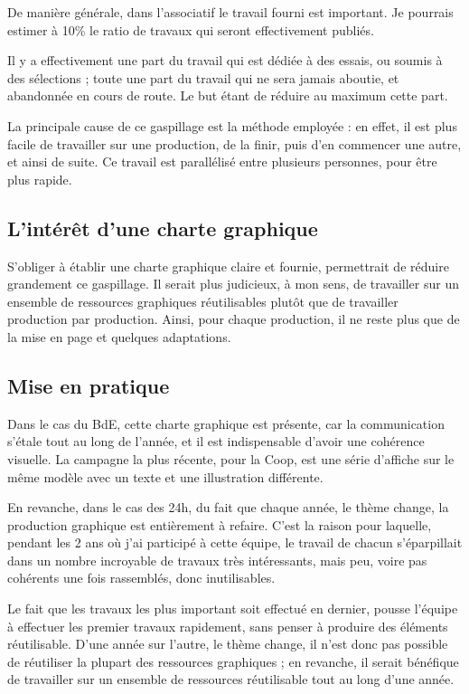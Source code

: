     De manière générale, dans l'associatif le travail fourni est important. Je pourrais estimer à 10\% le ratio de travaux qui seront effectivement publiés.

    Il y a effectivement une part du travail qui est dédiée à des essais, ou soumis à des sélections ; toute une part du travail qui ne sera jamais aboutie, et abandonnée en cours de route. Le but étant de réduire au maximum cette part.

    La principale cause de ce gaspillage est la méthode employée : en effet, il est plus facile de travailler sur une production, de la finir, puis d'en commencer une autre, et ainsi de suite. Ce travail est parallélisé entre plusieurs personnes, pour être plus rapide.

    \subsection{L'intérêt d'une charte graphique}
    
        S'obliger à établir une charte graphique claire et fournie, permettrait de réduire grandement ce gaspillage.
        Il serait plus judicieux, à mon sens, de travailler sur un ensemble de ressources graphiques réutilisables plutôt que de travailler production par production.
        Ainsi, pour chaque production, il ne reste plus que de la mise en page et quelques adaptations.

    \subsection{Mise en pratique}

        Dans le cas du BdE, cette charte graphique est présente, car la communication s'étale tout au long de l'année, et il est indispensable d'avoir une cohérence visuelle.
        La campagne la plus récente, pour la Coop, est une série d'affiche sur le même modèle avec un texte et une illustration différente.
        
        En revanche, dans le cas des 24h, du fait que chaque année, le thème change, la production graphique est entièrement à refaire.
        C'est la raison pour laquelle, pendant les 2 ans où j'ai participé à cette équipe, le travail de chacun s'éparpillait dans un nombre incroyable de travaux très intéressants, mais peu, voire pas cohérents une fois rassemblés, donc inutilisables.
        
        Le fait que les travaux les plus important soit effectué en dernier, pousse l'équipe à effectuer les premier travaux rapidement, sans penser à produire des éléments réutilisable.
        D'une année sur l'autre, le thème change, il n'est donc pas possible de réutiliser la plupart des ressources graphiques ; en revanche, il serait bénéfique de travailler sur un ensemble de ressources réutilisable tout au long d'une année.

